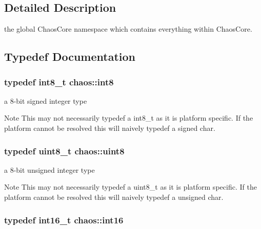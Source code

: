 \subsection{Detailed Description}
the global Chaos\+Core namespace which contains everything within Chaos\+Core. 

\subsection{Typedef Documentation}
\hypertarget{namespacechaos_a56015674cfe4ad1fc583c3da6c724d8a}{}
\subsubsection[{int8}]{\setlength{\rightskip}{0pt plus 5cm}typedef int8\+\_\+t {\bf chaos\+::int8}}\label{namespacechaos_a56015674cfe4ad1fc583c3da6c724d8a}


a 8-\/bit signed integer type 

\begin{DoxyNote}{Note}
This may not necessarily {\ttfamily typedef} a {\ttfamily int8\+\_\+t} as it is platform specific. If the platform cannot be resolved this will naively {\ttfamily typedef} a {\ttfamily signed char}. 
\end{DoxyNote}
\hypertarget{namespacechaos_a229e18634387996c2712d57f184bf363}{}
\subsubsection[{uint8}]{\setlength{\rightskip}{0pt plus 5cm}typedef uint8\+\_\+t {\bf chaos\+::uint8}}\label{namespacechaos_a229e18634387996c2712d57f184bf363}


a 8-\/bit unsigned integer type 

\begin{DoxyNote}{Note}
This may not necessarily {\ttfamily typedef} a {\ttfamily uint8\+\_\+t} as it is platform specific. If the platform cannot be resolved this will naively {\ttfamily typedef} a {\ttfamily unsigned char}. 
\end{DoxyNote}
\hypertarget{namespacechaos_a23112b8188c8a6ad32a86041fb4c088e}{}
\subsubsection[{int16}]{\setlength{\rightskip}{0pt plus 5cm}typedef int16\+\_\+t {\bf chaos\+::int16}}\label{namespacechaos_a23112b8188c8a6ad32a86041fb4c088e}


